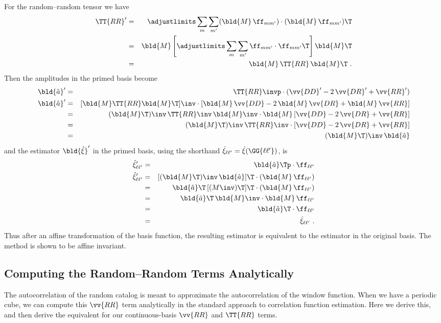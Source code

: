 For the random--random tensor we have
\begin{eqnarray}\displaystyle
\TT{RR}' &=& \adjustlimits \sum_{m} \sum_{m'} (\bld{M}\,\ff_{m m'}) \cdot (\bld{M}\,\ff_{m m'})\T \\
&=& \bld{M}\left[ \adjustlimits \sum_{m} \sum_{m'} \ff_{m m'} \cdot \ff_{m m'}\T \right] \bld{M}\T \\
&=& \bld{M}\,\TT{RR}\,\bld{M}\T ~.
\end{eqnarray}
Then the amplitudes in the primed basis become
\begin{eqnarray}\displaystyle
\bld{\hat a}' &=& \TT{RR}\invp \cdot (\vv{DD}' - 2\,\vv{DR}' + \vv{RR}') \\
\bld{\hat a}' &=& [\bld{M} \TT{RR} \bld{M}\T]\inv \cdot [\bld{M}\,\vv{DD} - 2\,\bld{M}\,\vv{DR} + \bld{M}\,\vv{RR}] \\
&=& (\bld{M}\T)\inv \, \TT{RR}\inv \, \bld{M}\inv \cdot \bld{M}\,[\vv{DD} - 2\,\vv{DR} + \vv{RR}] \\
&=& (\bld{M}\T)\inv \, \TT{RR}\inv \cdot [\vv{DD} - 2\,\vv{DR} + \vv{RR}] \\
&=& (\bld{M}\T)\inv \, \bld{\hat a}
\end{eqnarray}
and the estimator $\bld{\hat{\xi}}'$ in the primed basis, using the shorthand $\hat{\xi}_{\ell \ell'} = \hat{\xi}(\GG{\ell \ell'})$, is 
\begin{eqnarray}\displaystyle
\hat{\xi}_{\ell \ell'}' &=& \bld{\hat a}\Tp \cdot \ff_{\ell \ell'} \\
\hat{\xi}_{\ell \ell'}' &=& [(\bld{M}\T)\inv \, \bld{\hat a}]\T \cdot (\bld{M}\,\ff_{\ell \ell'}) \\
&=& \bld{\hat a}\T \, [(M\inv)\T]\T \cdot (\bld{M}\,\ff_{\ell \ell'}) \\
&=& \bld{\hat a}\T \, \bld{M}\inv \cdot \bld{M}\,\ff_{\ell \ell'} \\
&=& \bld{\hat a}\T \cdot \ff_{\ell \ell'} \\
&=& \hat{\xi}_{\ell \ell'} ~.
\end{eqnarray}
Thus after an affine transformation of the basis function, the resulting estimator is equivalent to the estimator in the original basis.
The method is shown to be affine invariant.


\subsection{Computing the Random--Random Terms Analytically}\label{sec:analytic}

The autocorrelation of the random catalog is meant to approximate the autocorrelation of the window function. 
When we have a periodic cube, we can compute this $\vv{RR}$ term analytically in the standard approach to correlation function estimation.
Here we derive this, and then derive the equivalent for our continuous-basis $\vv{RR}$ and $\TT{RR}$ terms.

